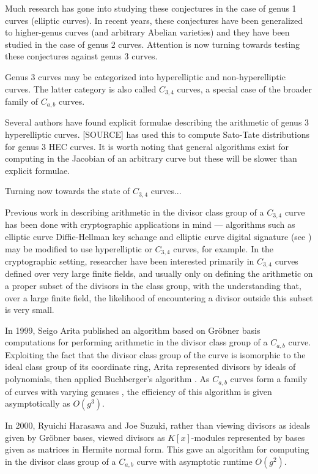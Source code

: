 Much research has gone into studying these conjectures in the case of genus 1 curves (elliptic curves).
In recent years, these conjectures have been generalized to higher-genus curves (and arbitrary Abelian varieties)
and they have been studied in the case of genus 2 curves.
Attention is now turning towards testing these conjectures against genus 3 curves.

Genus 3 curves may be categorized into hyperelliptic and non-hyperelliptic curves.
The latter category is also called $C_{3,4}$ curves, a special case of the broader family of $C_{a,b}$ curves.

Several authors have found explicit formulae describing the arithmetic of genus 3 hyperelliptic curves.
[SOURCE] has used this to compute Sato-Tate distributions for genus 3 HEC curves.
It is worth noting that general algorithms exist for computing in the Jacobian of an arbitrary curve
but these will be slower than explicit formulae.

Turning now towards the state of $C_{3,4}$ curves...

Previous work in describing arithmetic in the divisor class group of a $C_{3,4}$ curve has been done with cryptographic applications in mind ---
algorithms such as elliptic curve Diffie-Hellman key schange and elliptic curve digital signature (see )
may be modified to use hyperelliptic or $C_{3,4}$ curves, for example.
In the cryptographic setting, researcher have been interested primarily in $C_{3,4}$ curves defined over very large finite fields,
and usually only on defining the arithmetic on a proper subset of the divisors in the class group,
with the understanding that, over a large finite field, the likelihood of encountering a divisor outside this subset is very small.

In 1999, Seigo Arita published an algorithm based on Gr\"obner basis computations for performing arithmetic
in the divisor class group of a $C_{a,b}$ curve.
Exploiting the fact that the divisor class group of the curve is isomorphic to the ideal class group of its coordinate ring,
Arita represented divisors by ideals of polynomials, then applied Buchberger's algorithm .
As $C_{a,b}$ curves form a family of curves with varying genuses ,
the efficiency of this algorithm is given asymptotically as $O(g^3)$.

In 2000, Ryuichi Harasawa and Joe Suzuki, rather than viewing divisors as ideals given by Gr\"obner bases,
viewed divisors as $K[x]$-modules represented by bases given as matrices in Hermite normal form.
This gave an algorithm for computing in the divisor class group of a $C_{a,b}$ curve with asymptotic runtime $O(g^2)$.

